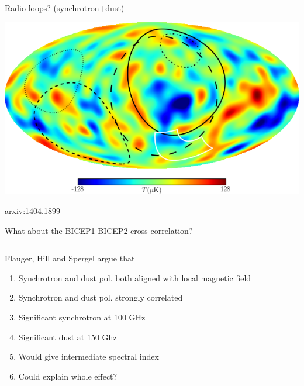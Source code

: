 \documentclass{beamer}
\begin{document}
\begin{frame}{Radio loops? (synchrotron+dust)}
	\begin{center}
		\includegraphics[width=\textwidth]{radioloops.png}

		{\footnotesize arxiv:1404.1899}

	\end{center}
\end{frame}

\begin{frame}{What about the BICEP1-BICEP2 cross-correlation?}
	\begin{columns}
		\begin{column}{6cm}
			Flauger, Hill and Spergel argue that
			\begin{enumerate}
				\item<2-> Synchrotron and dust pol. both aligned with local magnetic field
				\item<3-> Synchrotron and dust pol. strongly correlated
				\item<4-> Significant synchrotron at 100 GHz
				\item<5-> Significant dust at 150 Ghz
				\item<6-> Would give intermediate spectral index
				\item<7-> Could explain whole effect?
			\end{enumerate}
		\end{column}
		\begin{column}{6cm}
			\begin{center}
			\end{center}
		\end{column}
	\end{columns}
\end{frame}
\end{document}
